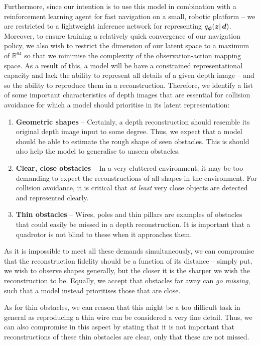 Furthermore, since our intention is to use this model in combination with a reinforcement learning agent for fast navigation on a small, robotic platform -- we are restricted to a lightweight inference network for representing $q_{\boldsymbol{\phi}}(\boldsymbol{z} |\, {\boldsymbol{d}})$.
Moreover, to ensure training a relatively quick convergence of our navigation policy, we also wish to restrict the dimension of our latent space to a maximum of $\mathbb{R}^{64}$ so that we minimise the complexity of the observation-action mapping space. 
As a result of this, a model will be have a constrained representational capacity and lack the ability to represent all details of a given depth image -- and so the ability to reproduce them in a reconstruction. Therefore, we identify a list of some important characteristics of depth images that are essential for collision avoidance for which a model should prioritise in its latent representation:
\begin{enumerate}
    \item \textbf{Geometric shapes} -- Certainly, a depth reconstruction should resemble its original depth image input to some degree. Thus, we expect that a model should be able to estimate the rough shape of seen obstacles. This is should also help the model to generalise to unseen obstacles.
    \item \textbf{Clear, close obstacles} -- In a very cluttered environment, it may be too demanding to expect the reconstructions of all shapes in the environment. For collision avoidance, it is critical that \textit{at least} very close objects are detected and represented clearly. 
    \item \textbf{Thin obstacles} -- Wires, poles and thin pillars are examples of obstacles that could easily be missed in a depth reconstruction. It is important that a quadrotor is not blind to these when it approaches them.
\end{enumerate}

As it is impossible to meet all these demands simultaneously, we can compromise that the reconstruction fidelity should be a function of its distance -- simply put, we wish to observe shapes generally, but the closer it is the sharper we wish the reconstruction to be. Equally, we accept that obstacles far away can \textit{go missing}, such that a model instead prioritises those that are close.

As for thin obstacles, we can reason that this might be a too difficult task in general as reproducing a thin wire can be considered a very fine detail. Thus, we can also compromise in this aspect by stating that it is not important that reconstructions of these thin obstacles are clear, only that these are not missed.